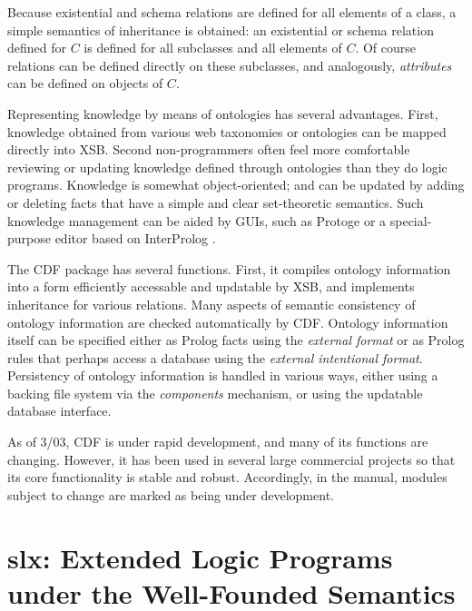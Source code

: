 {Because existential and schema relations are defined for all elements
of a class, a simple semantics of inheritance is obtained: an
existential or schema relation defined for $C$ is defined for all
subclasses and all elements of $C$.  Of course relations can be
defined directly on these subclasses, and analogously, {\em attributes}
can be defined on objects of $C$.

Representing knowledge by means of ontologies has several advantages.
First, knowledge obtained from various web taxonomies or ontologies
can be mapped directly into XSB.  Second non-programmers often feel
more comfortable reviewing or updating knowledge defined through
ontologies than they do logic programs.  Knowledge is somewhat
object-oriented; and can be updated by adding or deleting facts that
have a simple and clear set-theoretic semantics.  Such knowledge
management can be aided by GUIs, such as Protoge \cite{protege} or a
special-purpose editor based on InterProlog \cite{interprolog}.

The CDF package has several functions.  First, it compiles ontology
information into a form efficiently accessable and updatable by XSB,
and implements inheritance for various relations.  Many aspects of
semantic consistency of ontology information are checked automatically
by CDF.  Ontology information itself can be specified either as Prolog
facts using the {\em external format} or as Prolog rules that perhaps
access a database using the {\em external intentional format}.
Persistency of ontology information is handled in various ways, either
using a backing file system via the {\em components} mechanism, or
using the updatable database interface.

As of 3/03, CDF is under rapid development, and many of its functions
are changing.  However, it has been used in several large commercial
projects so that its core functionality is stable and robust.
Accordingly, in the manual, modules subject to change are marked as
being under development.
}

\section{ slx: Extended Logic Programs under the Well-Founded
Semantics}
\label{package:wfsx} 

